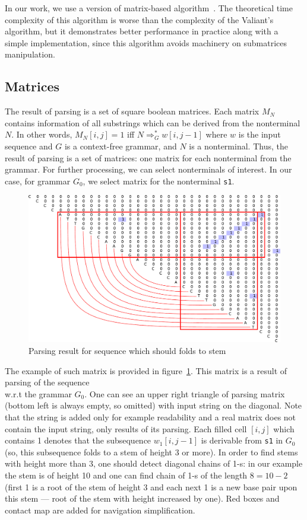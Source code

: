 \documentclass[a4paper,twoside]{article}
\begin{document}
In our work, we use a version of matrix-based algorithm~\cite{Azimov:2018:CPQ:3210259.3210264}.
The theoretical time complexity of this algorithm is worse than the complexity of the Valiant's algorithm, but it demonstrates better performance in practice along with a simple implementation, since this algorithm avoids machinery on submatrices manipulation.

\subsection{Matrices}

\noindent The result of parsing is a set of square boolean matrices. 
Each matrix $M_N$ contains information of all substrings which can be derived from the nonterminal $N$.
In other words, $M_N[i,j]=1$ iff $N \Rightarrow^*_G w[i,j-1]$ where $w$ is the input sequence and $G$ is a context-free grammar, and $N$ is a nonterminal.
Thus, the result of parsing is a set of matrices: one matrix for each nonterminal from the grammar.
For further processing, we can select nonterminals of interest.
In our case, for grammar $G_0$, we select matrix for the nonterminal \verb|s1|.

\begin{figure}
\centering
\includegraphics[width=.45\textwidth]{figures/4.pdf}
\caption{Parsing result for sequence which should folds to stem}
\label{fig:matrix-simple-stem}
\end{figure}

The example of such matrix is provided in figure~\ref{fig:matrix-simple-stem}.
This matrix is a result of parsing of the sequence {  \\} w.r.t the grammar $G_0$.
One can see an upper right triangle of parsing matrix (bottom left is always empty, so omitted) with input string on the diagonal.
Note that the string is added only for example readability and a real matrix does not contain the input string, only results of its parsing.
Each filled cell $[i,j]$ which contains 1 denotes that the subsequence $w_1[i,j-1]$ is derivable from \verb|s1| in $G_0$ (so, this subsequence folds to a stem of height 3 or more).
In order to find stems with height more than 3, one should detect diagonal chains of 1-s: in our example the stem is of height 10 and one can find chain of 1-s of the length $8=10-2$ (first 1 is a root of the stem of height 3 and each next 1 is a new base pair upon this stem --- root of the stem with height increased by one).
Red boxes and contact map are added for navigation simplification.
\end{document}
